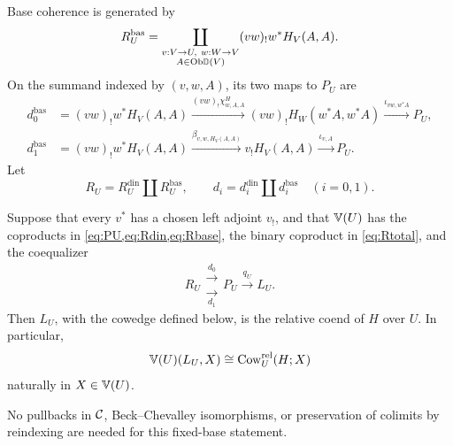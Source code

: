Base coherence is generated by
\begin{equation}
  R_U^{\mathrm{bas}}=
  \coprod_{\substack{v:V\to U,\ w:W\to V\\A\in\mathrm{Ob}\mathbb{D}(V)}}
      (vw)_!w^*H_V(A,A).
  \label{eq:Rbase}
\end{equation}
On the summand indexed by \((v,w,A)\), its two maps to \(P_U\) are
\begin{align}
  d^{\mathrm{bas}}_0
  &=(vw)_!w^*H_V(A,A)
    \xrightarrow{(vw)_!\chi^H_{w,A,A}}
    (vw)_!H_W(w^*A,w^*A)
    \xrightarrow{\iota_{vw,w^*A}}P_U,
  \label{eq:base-relation-first}
  \\
  d^{\mathrm{bas}}_1
  &=(vw)_!w^*H_V(A,A)
    \xrightarrow{\beta_{v,w,H_V(A,A)}}v_!H_V(A,A)
    \xrightarrow{\iota_{v,A}}P_U.
  \label{eq:base-relation-second}
\end{align}
Let
\begin{equation}
  R_U=R_U^{\mathrm{din}}\amalg R_U^{\mathrm{bas}},
  \qquad
  d_i=d_i^{\mathrm{din}}\amalg d_i^{\mathrm{bas}}\quad(i=0,1).
  \label{eq:Rtotal}
\end{equation}

\begin{theorem}
\label{thm:fixed-base-coequalizer}
Suppose that every \(v^*\) has a chosen left adjoint \(v_!\), and that
\(\mathbb{V}(U)\) has the coproducts in
\cref{eq:PU,eq:Rdin,eq:Rbase}, the binary coproduct in
\cref{eq:Rtotal}, and the coequalizer
\begin{equation}
  R_U\mathrel{\substack{\xrightarrow{d_0}\\[-0.35em]
                         \xrightarrow[d_1]{}}}
  P_U\xrightarrow{q_U}L_U.
  \label{eq:relative-coend-coeq}
\end{equation}
Then \(L_U\), with the cowedge defined below, is the relative coend of
\(H\) over \(U\).  In particular,
\[
  \mathbb{V}(U)(L_U,X)\cong\operatorname{Cow}^{\mathrm{rel}}_U(H;X)
\]
naturally in \(X\in\mathbb{V}(U)\).

No pullbacks in \(\mathcal{C}\), Beck--Chevalley isomorphisms, or preservation of
colimits by reindexing are needed for this fixed-base statement.
\end{theorem}


